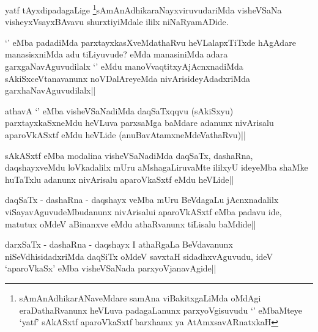 \begin{artha}
yatf tAyxdipadagaLige \footnote{sAmAnAdhikarANaveMdare samAna viBakitxgaLiMda oMdAgi eraDathaRvanunx heVLuva padagaLanunx parxyoVgisuvudu `\stext' eMbaMteye `yatf' sAkASxtf aparoVkaSxtf barxhamx ya AtAmxsavARnatxkaH}sAmAnAdhikaraNayxviruvudariMda visheVSaNa visheyxVsayxBAvavu shurxtiyiMdale ililx niNaRyamADide.
\end{artha}


\begin{artha}
`\stext' eMba padadiMda parxtayxkasXveMdathaRvu heVLalapxTiTxde hAgAdare manasisxniMda adu tiLiyuvude? eMda manasiniMda adara garxgaNavAguvudilalx `\stext' eMdu manoVvaqtitxyAjAcnxnadiMda sAkiSxceVtanavanunx noVDalAreyeMda nivArisideyAdadxriMda garxhaNavAguvudilalx||
\end{artha}


\begin{artha}
athavA `\stext' eMba visheVSaNadiMda daqSaTxqqvu (sAkiSxyu) parxtayxkaSxneMdu heVLuva parxsaMga baMdare adanunx nivArisalu aparoVkASxtf eMdu heVLide (anuBavAtamxneMdeVathaRvu)||
\end{artha}


\begin{artha}
sAkASxtf eMba modalina visheVSaNadiMda daqSaTx, dashaRna, daqshayxveMdu loVkadalilx mUru aMshagaLiruvaMte ililxyU ideyeMba shaMke huTaTxlu adanunx nivArisalu aparoVkaSxtf eMdu heVLide||
\end{artha}

\begin{artha}
daqSaTx - dashaRna - daqshayx veMba mUru BeVdagaLu jAcnxnadalilx  viSayavAguvudeMbudanunx nivArisalui aparoVkASxtf eMba padavu ide, matutux oMdeV aBinanxve eMdu athaRvanunx tiLisalu baMdide||
\end{artha}


\begin{artha}
darxSaTx - dashaRna - daqshayx I athaRgaLa BeVdavanunx niSeVdhisidadxriMda daqSiTx oMdeV savxtaH sidadhxvAguvudu, ideV `aparoVkaSx' eMba visheVSaNada parxyoVjanavAgide||
\end{artha}


